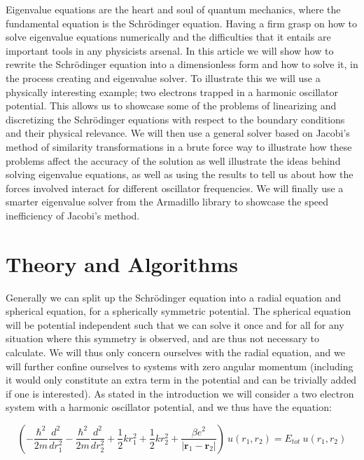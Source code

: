 \documentclass[a4paper,11pt]{article}
\begin{document}
{Eigenvalue equations are the heart and soul of quantum mechanics, where the fundamental equation is the Schrödinger equation. Having a firm grasp on how to solve eigenvalue equations numerically and the difficulties that it entails are important tools in any physicists arsenal. In this article we will show how to rewrite the Schrödinger equation into a dimensionless form and how to solve it, in the process creating and eigenvalue solver. To illustrate this we will use a physically interesting example; two electrons trapped in a harmonic oscillator potential. This allows us to showcase some of the problems of linearizing and discretizing the Schrödinger equations with respect to the boundary conditions and their physical relevance. We will then use a general solver based on Jacobi's method of similarity transformations in a brute force way to illustrate how these problems affect the accuracy of the solution as well illustrate the ideas behind solving eigenvalue equations, as well as using the results to tell us about how the forces involved interact for different oscillator frequencies. We will finally use a smarter eigenvalue solver from the Armadillo library \cite{Armadillo} to showcase the speed inefficiency of Jacobi's method.
		
		
		
		
\section*{Theory and Algorithms}

Generally we can split up the Schrödinger equation into a radial equation and spherical equation, for a spherically symmetric potential. The spherical equation will be potential independent such that we can solve it once and for all for any situation where this symmetry is observed, and are thus not necessary to calculate. We will thus only concern ourselves with the radial equation, and we will further confine ourselves to systems with zero angular momentum (including it would only constitute an extra term in the potential and can be trivially added if one is interested). As stated in the introduction we will consider a two electron system with a harmonic oscillator potential, and we thus have the equation:

\begin{equation}
\left(- \frac{\hbar^2}{2m}\frac{d^2}{d r_1^2} - \frac{\hbar^2}{2m}\frac{d^2}{d r_2^2} + \frac{1}{2}k r_1^2 + \frac{1}{2}k r_2^2 + \frac{\beta e^2}{|\mathbf{r}_1 - \mathbf{r}_2|}\right) \: u(r_1,r_2) = E_{tot} \: u(r_1,r_2)
\label{schro_radial}
\end{equation} 

}
\end{document}
